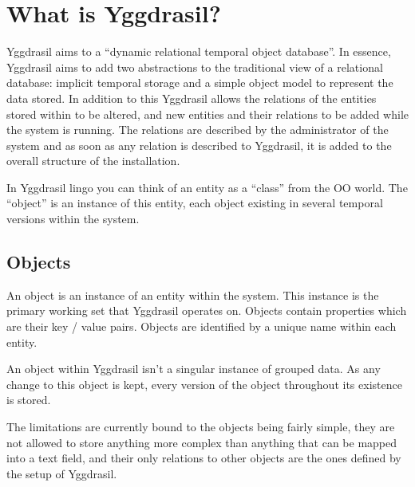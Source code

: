 \documentclass[english,a4paper]{article}
\begin{document}


\tableofcontents

\newpage

\section{What is Yggdrasil?}

Yggdrasil aims to a ``dynamic relational temporal object database''.
In essence, Yggdrasil aims to add two abstractions to the traditional
view of a relational database: implicit temporal storage and a simple
object model to represent the data stored.  In addition to this
Yggdrasil allows the relations of the entities stored within to be
altered, and new entities and their relations to be added while the
system is running.  The relations are described by the administrator
of the system and as soon as any relation is described to Yggdrasil,
it is added to the overall structure of the installation.  

In Yggdrasil lingo you can think of an entity as a ``class'' from the
OO world.  The ``object'' is an instance of this entity, each object
existing in several temporal versions within the system.

\subsection{Objects}

An object is an instance of an entity within the system.  This
instance is the primary working set that Yggdrasil operates on.
Objects contain properties which are their key / value pairs.  Objects
are identified by a unique name within each entity.


An object within Yggdrasil isn't a singular instance of grouped data.
As any change to this object is kept, every version of the object
throughout its existence is stored.  

The limitations are currently bound to the objects being fairly
simple, they are not allowed to store anything more complex than
anything that can be mapped into a text field, and their only
relations to other objects are the ones defined by the setup of
Yggdrasil.
\end{document}
